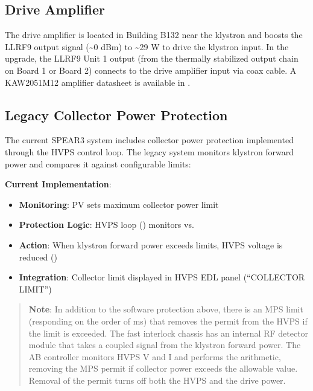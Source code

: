 {\subsection{Drive Amplifier}\label{drive-amplifier}

The drive amplifier is located in Building B132 near the klystron and boosts the LLRF9 output signal (\textasciitilde0 dBm) to \textasciitilde29 W to drive the klystron input. In the upgrade, the LLRF9 Unit 1 output (from the thermally stabilized output chain on Board 1 or Board 2) connects to the drive amplifier input via coax cable. A KAW2051M12 amplifier datasheet is available in .

\subsection{Legacy Collector Power Protection}\label{legacy-collector-power-protection}

The current SPEAR3 system includes collector power protection implemented through the HVPS control loop. The legacy system monitors klystron forward power and compares it against configurable limits:

\textbf{Current Implementation}:

\begin{itemize}
\tightlist
\item
  \textbf{Monitoring}:  PV sets maximum collector power limit
\item
  \textbf{Protection Logic}: HVPS loop () monitors  vs.~
\item
  \textbf{Action}: When klystron forward power exceeds limits, HVPS voltage is reduced ()
\item
  \textbf{Integration}: Collector limit displayed in HVPS EDL panel (``COLLECTOR LIMIT'')
\end{itemize}

\begin{quote}
\textbf{Note}: In addition to the software protection above, there is an MPS limit (responding on the order of ms) that removes the permit from the HVPS if the limit is exceeded. The fast interlock chassis has an internal RF detector module that takes a coupled signal from the klystron forward power. The AB controller monitors HVPS V and I and performs the arithmetic, removing the MPS permit if collector power exceeds the allowable value. Removal of the permit turns off both the HVPS and the drive power.
\end{quote}

}
